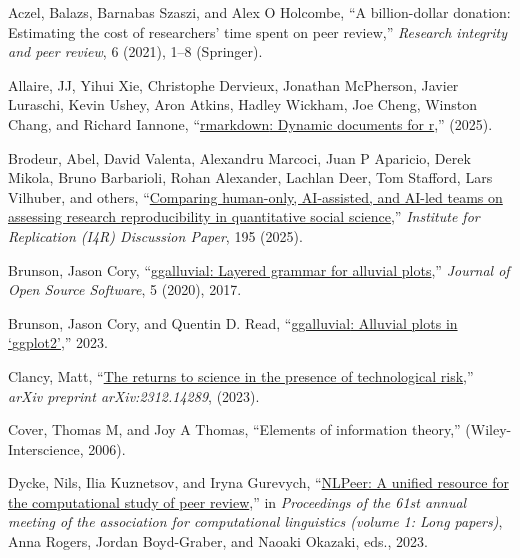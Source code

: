 \documentclass[
  11pt,
  letterpaper,
  DIV=11,
  numbers=noendperiod]{scrreprt}
\newlength{\cslhangindent}
\newenvironment{CSLReferences}[2] %
 {\begin{list}{}{%
  \setlength{\itemindent}{0pt}
  \setlength{\leftmargin}{0pt}
  \setlength{\parsep}{0pt}
  \ifodd #1
   \setlength{\leftmargin}{\cslhangindent}
   \setlength{\itemindent}{-1\cslhangindent}
  \fi
  \setlength{\itemsep}{#2\baselineskip}}}
 {\end{list}}
\begin{document}
\label{refs}
\begin{CSLReferences}{1}{0}
Aczel, Balazs, Barnabas Szaszi, and Alex O Holcombe, {``A billion-dollar
donation: Estimating the cost of researchers' time spent on peer
review,''} \emph{Research integrity and peer review}, 6 (2021), 1--8
(Springer).

Allaire, JJ, Yihui Xie, Christophe Dervieux, Jonathan McPherson, Javier
Luraschi, Kevin Ushey, Aron Atkins, Hadley Wickham, Joe Cheng, Winston
Chang, and Richard Iannone,
{``\href{https://github.com/rstudio/rmarkdown}{{rmarkdown}: Dynamic
documents for r},''} (2025).

Brodeur, Abel, David Valenta, Alexandru Marcoci, Juan P Aparicio, Derek
Mikola, Bruno Barbarioli, Rohan Alexander, Lachlan Deer, Tom Stafford,
Lars Vilhuber, and others,
{``\href{https://hdl.handle.net/10419/308508}{Comparing human-only,
AI-assisted, and AI-led teams on assessing research reproducibility in
quantitative social science},''} \emph{Institute for Replication (I4R)
Discussion Paper}, 195 (2025).

Brunson, Jason Cory,
{``\href{https://doi.org/10.21105/joss.02017}{{ggalluvial}: Layered
grammar for alluvial plots},''} \emph{Journal of Open Source Software},
5 (2020), 2017.

Brunson, Jason Cory, and Quentin D. Read,
{``\href{http://corybrunson.github.io/ggalluvial/}{{ggalluvial}:
Alluvial plots in {`{ggplot2}'}},''} 2023.

Clancy, Matt, {``\href{https://arxiv.org/abs/2312.14289}{The returns to
science in the presence of technological risk},''} \emph{arXiv preprint
arXiv:2312.14289}, (2023).

Cover, Thomas M, and Joy A Thomas, {``Elements of information theory,''}
(Wiley-Interscience, 2006).

Dycke, Nils, Ilia Kuznetsov, and Iryna Gurevych,
{``\href{https://aclanthology.org/2023.acl-long.277/}{{NLP}eer: A
unified resource for the computational study of peer review},''} in
\emph{Proceedings of the 61st annual meeting of the association for
computational linguistics (volume 1: Long papers)}, Anna Rogers, Jordan
Boyd-Graber, and Naoaki Okazaki, eds., 2023.


\end{CSLReferences}
\end{document}
